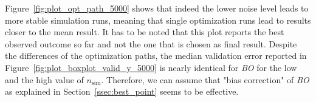 \documentclass[bimj,fleqn]{w-art}
\theoremstyle{plain}
\theoremstyle{definition}
\begin{document}
Figure~\ref{fig:plot_opt_path_5000} shows that indeed the lower noise level leads to more stable simulation runs, meaning that single optimization runs lead to results closer to the mean result.
It has to be noted that this plot reports the best observed outcome so far and not the one that is chosen as final result.
Despite the differences of the optimization paths, the median validation error reported in Figure~\ref{fig:plot_boxplot_valid_y_5000} is nearly identical for \emph{BO} for the low and the high value of $n_\text{sim}$.
Therefore, we can assume that "bias correction" of \emph{BO} as explained in Section~\ref{ssec:best_point} seems to be effective.
\end{document}
